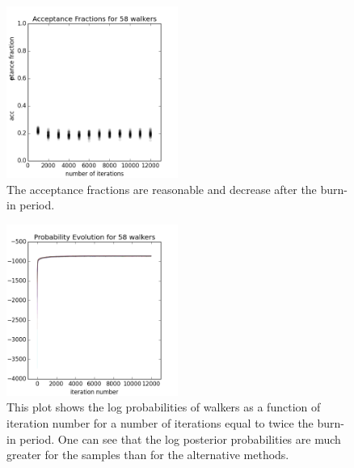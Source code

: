 \documentclass[preprint]{aastex}
\begin{document}
\begin{figure}
\includegraphics[width=0.5\textwidth]{fracs-real.png}
\caption{The acceptance fractions are reasonable and decrease after the burn-in period.}
\label{fig:nullfrac}
\end{figure}

\begin{figure}
\includegraphics[width=0.5\textwidth]{probs-real.png}
\caption{This plot shows the log probabilities of walkers as a function of iteration number for a number of iterations equal to twice the burn-in period.  One can see that the log posterior probabilities are much greater for the samples than for the alternative methods.}
\label{fig:nullprob}
\end{figure}
\end{document}
